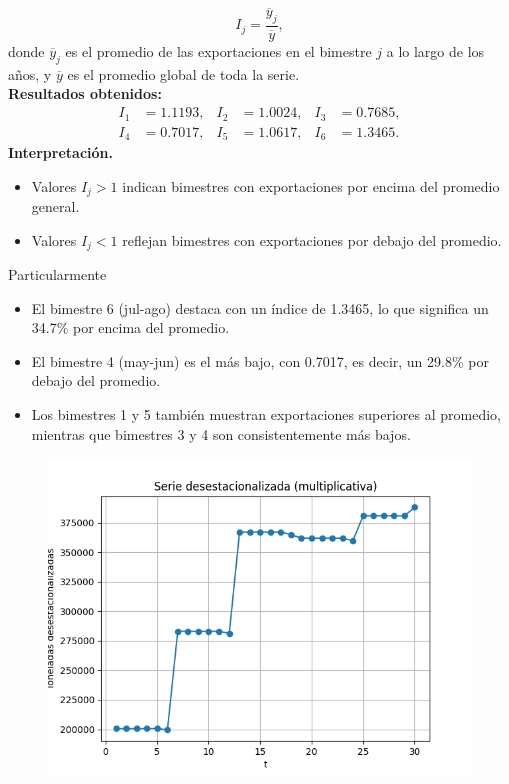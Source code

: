 \documentclass[10pt]{article}
\begin{document}
\begin{enumerate}
{\begin{equation}
        I_j = \frac{\overline{y}_j}{\overline{y}},
      \end{equation}
      donde $\overline{y}_j$ es el promedio de las exportaciones en el bimestre $j$ a lo largo de los años, y $\overline{y}$ es el promedio global de toda la serie.\\
      \noindent\textbf{Resultados obtenidos:}
      \begin{align}
        I_1 &= 1.1193, & I_2 &= 1.0024, & I_3 &= 0.7685, \\
        I_4 &= 0.7017, & I_5 &= 1.0617, & I_6 &= 1.3465.
      \end{align}
      \noindent\textbf{Interpretación.} 
      \begin{itemize}
        \item Valores $I_j > 1$ indican bimestres con exportaciones por encima del promedio general.
        \item Valores $I_j < 1$ reflejan bimestres con exportaciones por debajo del promedio.
      \end{itemize}
      Particularmente
      \begin{itemize}
        \item El bimestre 6 (jul-ago) destaca con un índice de 1.3465, lo que significa un 34.7\% por encima del promedio.
        \item El bimestre 4 (may-jun) es el más bajo, con 0.7017, es decir, un 29.8\% por debajo del promedio.
        \item Los bimestres 1 y 5 también muestran exportaciones superiores al promedio, mientras que bimestres 3 y 4 son consistentemente más bajos.
      \end{itemize}
  }
  \begin{figure}[H]
    \centering
    \includegraphics[width=0.80\linewidth]{../plots/python/avocado_exports_deseasonalized.png}

\end{figure}
\end{enumerate}
\end{document}
